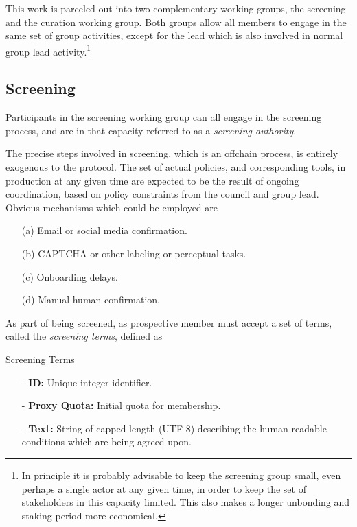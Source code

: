 \documentclass{article}
\newenvironment{concept_box}[1]
    {
    \begin{tcolorbox}
    {\large \textbf{#1} }
    }
    {
    \end{tcolorbox}
    }
\begin{document}
This work is parceled out into two complementary working groups, the screening and the curation working group. Both groups allow all members to engage in the same set of group activities, except for the lead which is also involved in normal group lead activity.\footnote{In principle it is probably advisable to keep the screening group small, even perhaps a single actor at any given time, in order to keep the set of stakeholders in this capacity limited. This also makes a longer unbonding and staking period more economical.}

\subsection{Screening}

Participants in the screening working group can all engage in the screening process, and are in that capacity referred to as a \textit{screening authority}.

The precise steps involved in screening, which is an offchain process, is entirely exogenous to the protocol. The set of actual policies, and corresponding tools, in production at any given time are expected to be the result of ongoing coordination, based on policy constraints from the council and group lead. Obvious mechanisms which could be employed are



\begin{enumerate}
  \item[(a)] Email or social media confirmation.
  \item[(b)] CAPTCHA or other labeling or perceptual tasks.
  \item[(c)] Onboarding delays.
  \item[(d)] Manual human confirmation.
\end{enumerate}

As part of being screened, as prospective member must accept a set of terms, called the \textit{screening terms}, defined as\\

\begin{concept_box}{Screening Terms}
    \begin{itemize}
      \item[-] \textbf{ID:} Unique integer identifier.
      \item[-] \textbf{Proxy Quota:} Initial quota for membership.
      \item[-] \textbf{Text:} String of capped length (UTF-8) describing the human readable conditions which are being agreed upon.
    \end{itemize}
\end{concept_box}
\end{document}
